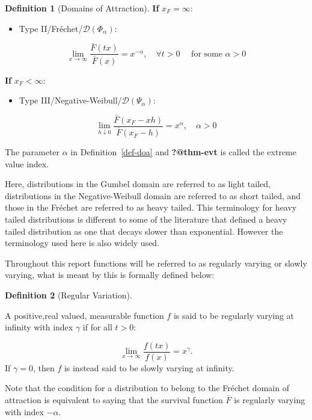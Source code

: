\documentclass[
  10pt,
  a4paper,
]{scrreprt}
\providecommand{\tightlist}{%
  \setlength{\itemsep}{0pt}\setlength{\parskip}{0pt}}\usepackage{longtable,booktabs,array}
\theoremstyle{plain}
\theoremstyle{definition}
\newtheorem{definition}{Definition}[section]
\theoremstyle{plain}
\theoremstyle{remark}
\begin{document}
{\begin{definition}[Domains of
Attraction]
\textbf{If} \(x_F=\infty\):

\begin{itemize}
\tightlist
\item
  Type II/Fréchet/\(\mathcal D (\Phi_\alpha)\):
\end{itemize}

\[
\lim_{x\rightarrow\infty} \displaystyle\frac{\bar F(tx)}{\bar F(x)} = x^{-\alpha}, \quad \forall t>0 \quad \text{ for some } \alpha>0
\]

\textbf{If} \(x_F<\infty\):

\begin{itemize}
\tightlist
\item
  Type III/Negative-Weibull/\(\mathcal D(\Psi_\alpha)\):
\end{itemize}

\[
\lim_{h\downarrow 0}\displaystyle\frac{\bar F(x_F-xh)}{\bar F(x_F-h)} = x^\alpha, \quad\alpha>0
\]

\end{definition}

The parameter \(\alpha\) in Definition~\ref{def-doa} and
\textbf{?@thm-evt} is called the extreme value index.

Here, distributions in the Gumbel domain are referred to as light
tailed, distributions in the Negative-Weibull domain are referred to as
short tailed, and those in the Fréchet are referred to as heavy tailed.
This terminology for heavy tailed distributions is different to some of
the literature that defined a heavy tailed distribution as one that
decays slower than exponential. However the terminology used here is
also widely used.

Throughout this report functions will be referred to as regularly
varying or slowly varying, what is meant by this is formally defined
below:

\begin{definition}[Regular
Variation]\protect\hypertarget{def-rv}{}\label{def-rv}

A positive,real valued, measurable function \(f\) is said to be
regularly varying at infinity with index \(\gamma\) if for all \(t>0\):

\[
\lim_{x\rightarrow\infty}\displaystyle\frac{f(tx)}{f(x)} = x^{\gamma}.
\] If \(\gamma =0\), then \(f\) is instead said to be slowly varying at
infinity.

\end{definition}

Note that the condition for a distribution to belong to the Fréchet
domain of attraction is equivalent to saying that the survival function
\(\bar F\) is regularly varying with index \(-\alpha\).

}
\end{document}
